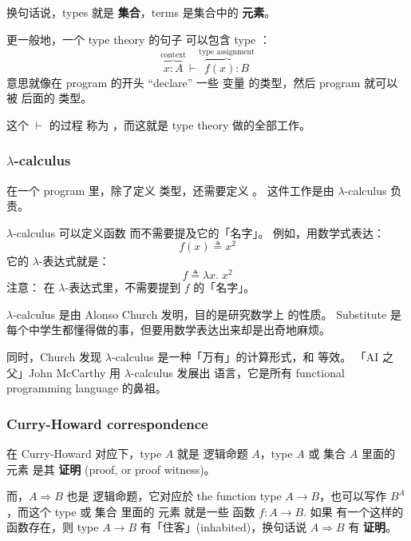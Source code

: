 换句话说，types 就是 \textbf{集合}，terms 是集合中的 \textbf{元素}。 

更一般地，一个 type theory 的句子 可以包含 type ：
\begin{equation}
\overbrace{x : A}^{\mbox{context}} \vdash \overbrace{f(x) : B}^{\mbox{type assignment}}
\end{equation}
意思就像在 program 的开头 ``declare'' 一些 变量 的类型，然后 program 就可以被  后面的 类型。 

这个 $\vdash$ 的过程 称为 ，而这就是 type theory 做的全部工作。 

\subsubsection{$\lambda$-calculus}

在一个 program 里，除了定义 类型，还需要定义 。 这件工作是由 $\lambda$-calculus 负责。

$\lambda$-calculus 可以定义函数 而不需要提及它的「名字」。 例如，用数学式表达：
\begin{equation}
f(x) \triangleq x^2
\end{equation}
它的 $\lambda$-表达式就是：
\begin{equation}
f \triangleq \lambda x. \; x^2
\end{equation}
注意： 在 $\lambda$-表达式里，不需要提到 $f$ 的「名字」。

$\lambda$-calculus 是由 Alonso Church 发明，目的是研究数学上  的性质。 Substitute 是每个中学生都懂得做的事，但要用数学表达出来却是出奇地麻烦。 

同时，Church 发现 $\lambda$-calculus 是一种「万有」的计算形式，和  等效。 「AI 之父」John McCarthy 用 $\lambda$-calculus 发展出  语言，它是所有 functional programming language 的鼻祖。 

\subsubsection{Curry-Howard correspondence}

在 Curry-Howard 对应下，type $A$ 就是 逻辑命题 $A$，type $A$ 或 集合 $A$ 里面的 元素 是其 \textbf{证明} (proof, or proof witness)。

而，$A \Rightarrow B$ 也是 逻辑命题，它对应於 the function type $A \rightarrow B$，也可以写作 $B^A$，而这个 type 或 集合 里面的 元素 就是一些 函数 $f: A \rightarrow B$.  如果 有一个这样的函数存在，则 type $A \rightarrow B$ 有「住客」(inhabited)，换句话说 $A \Rightarrow B$ 有 \textbf{证明}。 

